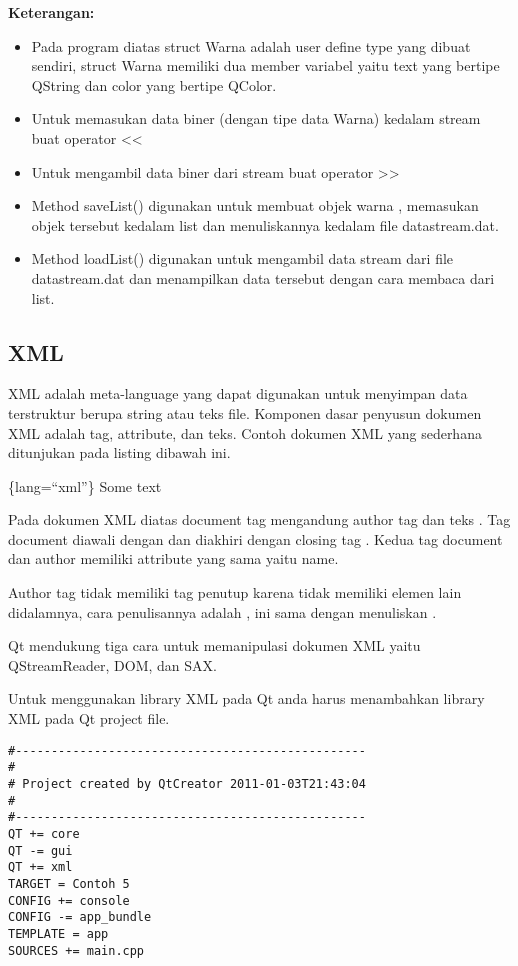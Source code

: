 \textbf{Keterangan:}

\begin{itemize}
\tightlist
\item
  Pada program diatas struct Warna adalah user define type yang dibuat
  sendiri, struct Warna memiliki dua member variabel yaitu text yang
  bertipe QString dan color yang bertipe QColor.
\item
  Untuk memasukan data biner (dengan tipe data Warna) kedalam stream
  buat operator \textless{}\textless{}
\item
  Untuk mengambil data biner dari stream buat operator
  \textgreater{}\textgreater{}
\item
  Method saveList() digunakan untuk membuat objek warna , memasukan
  objek tersebut kedalam list dan menuliskannya kedalam file
  datastream.dat.
\item
  Method loadList() digunakan untuk mengambil data stream dari file
  datastream.dat dan menampilkan data tersebut dengan cara membaca dari
  list.
\end{itemize}

\subsection{XML}\label{xml}

XML adalah meta-language yang dapat digunakan untuk menyimpan data
terstruktur berupa string atau teks file. Komponen dasar penyusun
dokumen XML adalah tag, attribute, dan teks. Contoh dokumen XML yang
sederhana ditunjukan pada listing dibawah ini.

\{lang=``xml''\} Some text

Pada dokumen XML diatas document tag mengandung author tag dan teks .
Tag document diawali dengan dan diakhiri dengan closing tag . Kedua tag
document dan author memiliki attribute yang sama yaitu name.

Author tag tidak memiliki tag penutup karena tidak memiliki elemen lain
didalamnya, cara penulisannya adalah , ini sama dengan menuliskan .

Qt mendukung tiga cara untuk memanipulasi dokumen XML yaitu
QStreamReader, DOM, dan SAX.

Untuk menggunakan library XML pada Qt anda harus menambahkan library XML
pada Qt project file.

\begin{verbatim}
#-------------------------------------------------
#
# Project created by QtCreator 2011-01-03T21:43:04
#
#-------------------------------------------------
QT += core
QT -= gui
QT += xml
TARGET = Contoh 5
CONFIG += console
CONFIG -= app_bundle
TEMPLATE = app
SOURCES += main.cpp
\end{verbatim}

